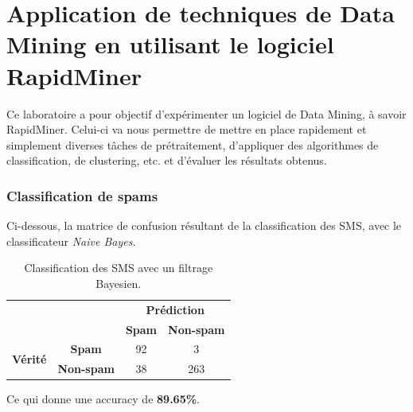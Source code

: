\documentclass[a4paper]{article}
\begin{document}
\part*{Application de techniques de Data Mining en utilisant le logiciel RapidMiner}
Ce laboratoire a pour objectif d'expérimenter un logiciel de Data Mining, à savoir RapidMiner.
Celui-ci va nous permettre de mettre en place rapidement et simplement diverses tâches de prétraitement, d'appliquer des algorithmes de classification, de clustering, etc. et d'évaluer les résultats obtenus.

\section{Classification de spams}
Ci-dessous, la matrice de confusion résultant de la classification des SMS, avec le classificateur \textit{Naive Bayes}.
\begin{table}[H]
	\centering
	\def\arraystretch{2.0}
	\begin{tabular}{cccl}
	& \textbf{}
	& \multicolumn{2}{c}{\textbf{Prédiction}}\\\cline{3-4} 
	& \multicolumn{1}{c|}{}
	& \multicolumn{1}{c|}{\textbf{Spam}}
	& \multicolumn{1}{c|}{\textbf{Non-spam}}\\ \cline{2-4} 
	\multicolumn{1}{c|}{\multirow{2}{*}{\textbf{Vérité}}}
	& \multicolumn{1}{c|}{\textbf{Spam}}
	&\multicolumn{1}{c|}{92}
	& \multicolumn{1}{c|}{3}\\ \cline{2-4} 
	\multicolumn{1}{c|}{}
	& \multicolumn{1}{c|}{\textbf{Non-spam}}
	& \multicolumn{1}{c|}{38}
	& \multicolumn{1}{c|}{263}\\ \cline{2-4} 
	\end{tabular}
	\caption{Classification des SMS avec un filtrage Bayesien.}
\end{table}
Ce qui donne une accuracy de \textbf{89.65\%}.
\end{document}
